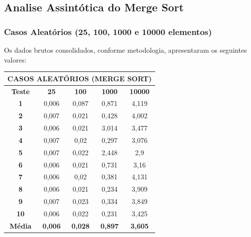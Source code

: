 \documentclass[a4paper, 12pt]{article}
\begin{document}
\vspace{0.8cm}
\subsection{Analise Assintótica do Merge Sort}


\subsubsection{Casos Aleatórios (25, 100, 1000 e 10000 elementos)}

\tab{ }Os dados brutos consolidados, conforme metodologia, apresentaram os seguintes valores:
\vspace{0.2cm}

\begin{minipage}{1.0\textwidth}
  \begin{minipage}[c]{0.49\textwidth}
  \centering
\begin{tabular}{ccccc}

                   \multicolumn{ 5}{c}{{\bf CASOS ALEATÓRIOS (MERGE SORT)}} \\
\hline
{\bf Teste} &   {\bf 25} &  {\bf 100} & {\bf 1000} & {\bf 10000} \\
\hline
   {\bf 1} &      0,006 &      0,087 &      0,871 &      4,119 \\
\hline
   {\bf 2} &      0,007 &      0,021 &      0,428 &      4,002 \\
\hline
   {\bf 3} &      0,006 &      0,021 &      3,014 &      3,477 \\
\hline
   {\bf 4} &      0,007 &       0,02 &      0,297 &      3,076 \\
\hline
   {\bf 5} &      0,007 &      0,022 &      2,448 &        2,9 \\
\hline
   {\bf 6} &      0,006 &      0,021 &      0,731 &       3,16 \\
\hline
   {\bf 7} &      0,006 &       0,02 &      0,381 &      4,131 \\
\hline
   {\bf 8} &      0,006 &      0,021 &      0,234 &      3,909 \\
\hline
   {\bf 9} &      0,007 &      0,023 &      0,334 &      3,849 \\
\hline
  {\bf 10} &      0,006 &      0,022 &      0,231 &      3,425 \\
\hline
{\bf Média} & {\bf 0,006} & {\bf 0,028} & {\bf 0,897} & {\bf 3,605} \\
\hline
\end{tabular}  



\end{minipage}
\end{minipage}
\end{document}
